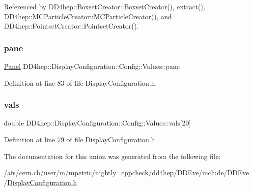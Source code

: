 Referenced by D\+D4hep\+::\+Boxset\+Creator\+::\+Boxset\+Creator(), extract(), D\+D4hep\+::\+M\+C\+Particle\+Creator\+::\+M\+C\+Particle\+Creator(), and D\+D4hep\+::\+Pointset\+Creator\+::\+Pointset\+Creator().

\hypertarget{union_d_d4hep_1_1_display_configuration_1_1_config_1_1_values_af61c2a6b0a332acd9edf8e8387e8fd0c}{}\label{union_d_d4hep_1_1_display_configuration_1_1_config_1_1_values_af61c2a6b0a332acd9edf8e8387e8fd0c} 
\subsubsection{\texorpdfstring{pane}{pane}}
{\footnotesize\ttfamily \hyperlink{struct_d_d4hep_1_1_display_configuration_1_1_panel}{Panel} D\+D4hep\+::\+Display\+Configuration\+::\+Config\+::\+Values\+::pane}



Definition at line 83 of file Display\+Configuration.\+h.

\hypertarget{union_d_d4hep_1_1_display_configuration_1_1_config_1_1_values_aba0dbc907603e0decb003ec889e684b9}{}\label{union_d_d4hep_1_1_display_configuration_1_1_config_1_1_values_aba0dbc907603e0decb003ec889e684b9} 
\subsubsection{\texorpdfstring{vals}{vals}}
{\footnotesize\ttfamily double D\+D4hep\+::\+Display\+Configuration\+::\+Config\+::\+Values\+::vals\mbox{[}20\mbox{]}}



Definition at line 79 of file Display\+Configuration.\+h.



The documentation for this union was generated from the following file\+:\begin{DoxyCompactItemize}
\item 
/afs/cern.\+ch/user/m/mpetric/nightly\+\_\+cppcheck/dd4hep/\+D\+D\+Eve/include/\+D\+D\+Eve/\hyperlink{_display_configuration_8h}{Display\+Configuration.\+h}\end{DoxyCompactItemize}
